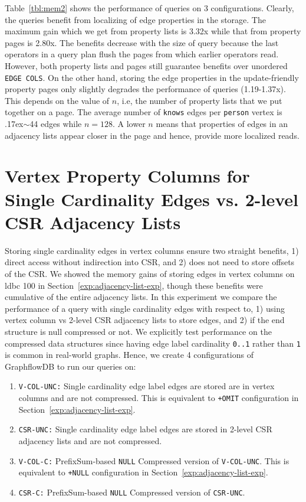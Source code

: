 Table~\ref{tbl:mem2} shows the performance of queries on 3 configurations. Clearly, the queries benefit from localizing of edge properties in the storage. The maximum gain which we get from property lists is 3.32x while that from property pages is 2.80x. The benefits decrease with the size of query because the last operators in a query plan flush the pages from which earlier operators read. However, both property lists and pages still guarantee benefits over unordered \texttt{EDGE COLS}. On the other hand, storing the edge properties in the update-friendly property pages only slightly degrades the performance of queries (1.19-1.37x). This depends on the value of $n$, i.e, the number of property lists that we put together on a page. The average number of \texttt{knows} edges per \texttt{person} vertex is {\raise.17ex\hbox{$\scriptstyle\sim$}}44 edges while $n=128$. A lower $n$ means that properties of edges in an adjacency lists appear closer in the page and hence, provide more localized reads.

\section{Vertex Property Columns for Single Cardinality Edges vs. 2-level CSR Adjacency Lists}
\label{exp:single-cardinality}

Storing single cardinality edges in vertex columns ensure two straight benefits, 1) direct access without indirection into CSR, and 2) does not need to store offsets of the CSR. We showed the memory gains of storing edges in vertex columns on \gls{ldbc} 100 in Section~\ref{exp:adjacency-list-exp}, though these benefits were cumulative of the entire adjacency lists. In this experiment we compare the performance of a query with single cardinality edges with respect to, 1) using vertex column vs 2-level CSR adjacency lists to store edges, and 2) if the end structure is null compressed or not. We explicitly test performance on the compressed data structures since having edge label cardinality \texttt{0..1} rather than \texttt{1} is common in real-world graphs. Hence, we create 4 configurations of GraphflowDB to run our queries on:

\begin{enumerate}
	\item \texttt{V-COL-UNC:} Single cardinality edge label edges are stored are in vertex columns and are not compressed. This is equivalent to \texttt{+OMIT} configuration in Section~\ref{exp:adjacency-list-exp}.
	\item \texttt{CSR-UNC:} Single cardinality edge label edges are stored in 2-level CSR adjacency lists and are not compressed.
	\item \texttt{V-COL-C:} PrefixSum-based \texttt{NULL} Compressed version of \texttt{V-COL-UNC}. This is equivalent to \texttt{+NULL} configuration in Section~\ref{exp:adjacency-list-exp}.
	\item \texttt{CSR-C:} PrefixSum-based \texttt{NULL} Compressed version of \texttt{CSR-UNC}.
\end{enumerate}

